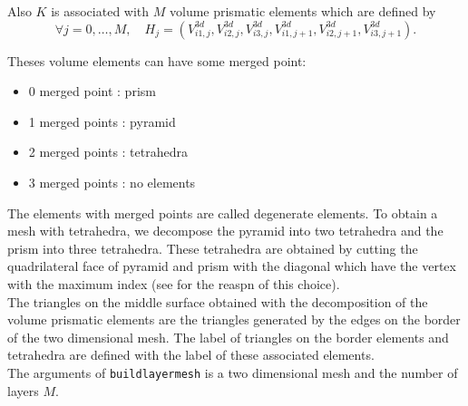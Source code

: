 \documentclass[a4paper,twoside,12pt]{book}
\begin{document}
Also $K$ is associated with $M$ volume prismatic elements which are defined by
$$
\forall j=0,\ldots,M, \quad H_{j} = ( V_{i1,j}^{3d}, V_{i2,j}^{3d}, V_{i3,j}^{3d}, V_{i1,j+1}^{3d}, V_{i2,j+1}^{3d}, V_{i3,j+1}^{3d} ).
$$

Theses volume elements can have some merged point:
\begin{itemize}
\item 0 merged point : prism
\item 1 merged points : pyramid
\item 2 merged points : tetrahedra
\item 3 merged points : no elements
\end{itemize}

The elements with merged points are called degenerate elements. To obtain a mesh with tetrahedra, we decompose
the pyramid into two tetrahedra and the prism into three tetrahedra. These tetrahedra are obtained by cutting the quadrilateral
face of pyramid and prism with the diagonal which have the vertex with the maximum index (see \cite{hdrHecht} for the reaspn of this choice).\\

The triangles on the middle surface obtained with the decomposition of the volume prismatic elements are the triangles generated by the edges
on the border of the two dimensional mesh. The label of triangles on the border elements and tetrahedra are defined with the label of these
associated elements.\\


The arguments of \texttt{buildlayermesh} is a two dimensional mesh and the number of layers $M$.
\end{document}
